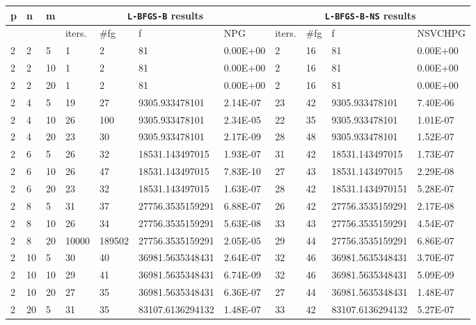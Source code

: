 \begin{center}
  \begin{table}
    \begin{center}
      \scriptsize
      \begin{tabular}{|l|l|l|l|l|l|l|l|l|l|l|}
        \hline
      p &  n  &  m  & \multicolumn{4}{|c|}{\texttt{L-BFGS-B} results} & \multicolumn{4}{|c|}{\texttt{L-BFGS-B-NS} results} \\ \hline
        & &  & iters. & \#fg & f & NPG & iters. & \#fg & f & NSVCHPG \\ \hline
      2 &  2 & 5 & 1 & 2 & 81 & 0.00E+00 & 2 & 16 & 81 & 0.00E+00 \\
      2 &  2 & 10 & 1 & 2 & 81 & 0.00E+00 & 2 & 16 & 81 & 0.00E+00\\
      2 &  2 & 20 & 1 & 2 & 81 & 0.00E+00 & 2 & 16 & 81 & 0.00E+00\\
     2 &   4 & 5 & 19 & 27 & 9305.933478101 & 2.14E-07 & 23 & 42 & 9305.933478101 & 7.40E-06\\
      2 &  4 & 10 & 26 & 100 & 9305.933478101 & 2.34E-05 & 22 & 35 & 9305.933478101 & 1.01E-07\\
      2 &  4 & 20 & 23 & 30 & 9305.933478101 & 2.17E-09 & 28 & 48 & 9305.933478101 & 1.52E-07\\
      2 &  6 & 5 & 26 & 32 & 18531.143497015 & 1.93E-07 & 31 & 42 & 18531.143497015 & 1.73E-07\\
      2 &  6 & 10 & 26 & 47 & 18531.143497015 & 7.83E-10 & 27 & 43 & 18531.143497015 & 2.29E-08\\
      2 &  6 & 20 & 23 & 32 & 18531.143497015 & 1.63E-07 & 28 & 42 & 18531.1434970151 & 5.28E-07\\
      2 &  8 & 5 & 31 & 37 & 27756.3535159291 & 6.88E-07 & 26 & 42 & 27756.3535159291 & 2.17E-08\\
      2 &  8 & 10 & 26 & 34 & 27756.3535159291 & 5.63E-08 & 33 & 43 & 27756.3535159291 & 4.54E-07\\
      2 &  8 & 20 & 10000 & 189502 & 27756.3535159291 & 2.05E-05 & 29 & 44 & 27756.3535159291 & 6.86E-07\\
      2 &  10 & 5 & 30 & 40 & 36981.5635348431 & 2.64E-07 & 32 & 46 & 36981.5635348431 & 3.70E-07\\
      2 &  10 & 10 & 29 & 41 & 36981.5635348431 & 6.74E-09 & 32 & 46 & 36981.5635348431 & 5.09E-09\\
      2 &  10 & 20 & 27 & 35 & 36981.5635348431 & 6.36E-07 & 27 & 44 & 36981.5635348431 & 1.48E-07\\
      2 &  20 & 5 & 31 & 35 & 83107.6136294132 & 1.48E-07 & 33 & 42 & 83107.6136294132 & 5.27E-07\\

\end{tabular}
\end{center}
\end{table}
\end{center}
